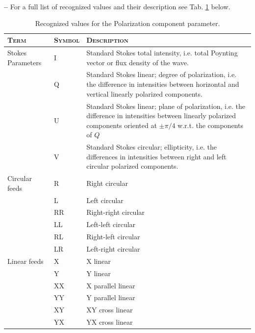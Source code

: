\begin{list}{\textbf{--}}{}
 For a full list of recognized values and their description see
  Tab. \ref{tab:polarization-values} below.
  \begin{table}[ht]
    \centering
    \begin{tabular}{|llp{10cm}|}
      \hline
      \textsc{Term} & \textsc{Symbol} & \textsc{Description} \\
      \hline \hline
      Stokes Parameters & I & Standard Stokes total intensity,
      i.e. total Poynting vector or flux density of the wave. \\
      & Q  & Standard Stokes linear; degree of polarization, i.e. the
      difference in intensities between horizontal and vertical
      linearly polarized components. \\
      & U  & Standard Stokes linear; plane of polarization, i.e. the
      difference in intensities between linearly polarized components
      oriented at $\pm \pi/4$ w.r.t. the components of $Q$ \\
      & V  & Standard Stokes circular; ellipticity, i.e. the differences
      in intensities between right and left circular polarized
      components. \\
      \hline
      Circular feeds & R  & Right circular \\
      & L  & Left circular \\
      & RR & Right-right circular \\
      & LL & Left-left circular \\
      & RL & Right-left circular \\
      & LR & Left-right circular \\
      \hline
      Linear feeds & X  & X linear \\
      & Y  & Y linear \\
      & XX & X parallel linear \\
      & YY & Y parallel linear \\
      & XY & XY cross linear \\
      & YX & YX cross linear \\
      \hline
    \end{tabular}
    \caption{Recognized values for the Polarization component parameter.}
    \label{tab:polarization-values}
  \end{table}
\end{list}
